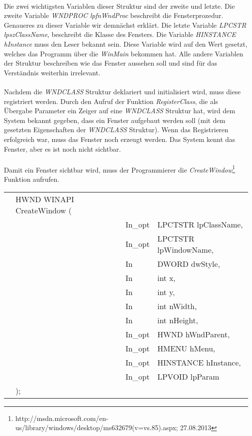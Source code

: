 \paragraph{}
Die zwei wichtigsten Variablen dieser Struktur sind der zweite und letzte. Die zweite Variable \textit{WNDPROC lpfnWndProc} beschreibt die Fensterprozedur. Genaueres zu dieser Variable wir demnächst erklärt. Die letzte Variable \textit{LPCSTR lpszClassName}, beschreibt die Klasse des Fensters. Die Variable \textit{HINSTANCE hInstance} muss den Leser bekannt sein. Diese Variable wird auf den Wert gesetzt, welches das Programm über die \textit{WinMain} bekommen hat. Alle andere Variablen der Struktur beschreiben wie das Fenster aussehen soll und sind für das Verständnis weiterhin irrelevant.

\paragraph{}
Nachdem die \textit{WNDCLASS} Struktur deklariert und initialisiert wird, muss diese registriert werden. Durch den Aufruf der Funktion \textit{RegisterClass}, die als Übergabe Parameter ein Zeiger auf eine \textit{WNDCLASS} Struktur hat, wird dem System bekannt gegeben, dass ein Fenster aufgebaut werden soll (mit dem gesetzten Eigenschaften der \textit{WNDCLASS} Struktur). Wenn das Registrieren erfolgreich war, muss das Fenster noch erzeugt werden. Das System kennt das Fenster, aber es ist noch nicht sichtbar.

\paragraph{}
Damit ein Fenster sichtbar wird, muss der Programmierer die \textit{CreateWindow}\footnote{http://msdn.microsoft.com/en-us/library/windows/desktop/ms632679(v=vs.85).aspx; 27.08.2013} Funktion aufrufen. 


\begin{tabular}{llll}
&HWND WINAPI CreateWindow (&\\
& & In\_opt & LPCTSTR lpClassName,\\
& & In\_opt & LPCTSTR lpWindowName,\\
& & In      & DWORD dwStyle,\\
& & In      & int x,\\
& & In      & int y,\\
& & In      & int nWidth,\\
& & In      & int nHeight,\\
& & In\_opt & HWND hWndParent,\\
& & In\_opt & HMENU hMenu,\\
& & In\_opt & HINSTANCE hInstance,\\
& & In\_opt & LPVOID lpParam\\
&);
\end{tabular}


